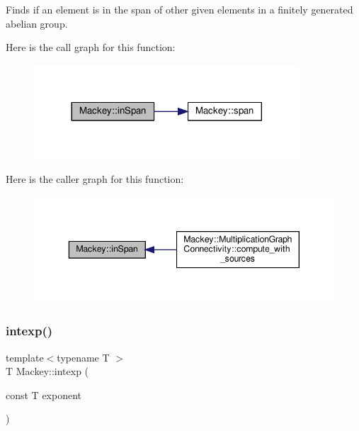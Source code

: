 Finds if an element is in the span of other given elements in a finitely generated abelian group. 

Here is the call graph for this function\+:\nopagebreak
\begin{figure}[H]
\begin{center}
\leavevmode
\includegraphics[width=281pt]{namespaceMackey_a1ff253bf7e043ad6455b5fea23a83f09_cgraph}
\end{center}
\end{figure}
Here is the caller graph for this function\+:\nopagebreak
\begin{figure}[H]
\begin{center}
\leavevmode
\includegraphics[width=343pt]{namespaceMackey_a1ff253bf7e043ad6455b5fea23a83f09_icgraph}
\end{center}
\end{figure}
\mbox{\label{namespaceMackey_a4904fdc0fdcf3c23d7f3b80f59b2eafa}} 
\subsubsection{\texorpdfstring{intexp()}{intexp()}}
{\footnotesize\ttfamily template$<$typename T $>$ \\
T Mackey\+::intexp (\begin{DoxyParamCaption}\item[{const T}]{exponent }\end{DoxyParamCaption})\hspace{0.3cm}{\ttfamily [inline]}}



